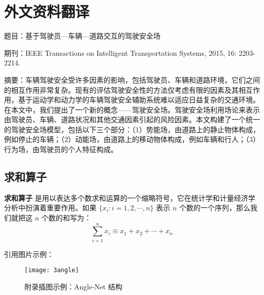 
\chapter{外文资料翻译}

题目：基于驾驶员—车辆—道路交互的驾驶安全场

期刊：IEEE Transactions on Intelligent Transportation Systems, 2015, 16: 2203-2214.

摘要：车辆驾驶安全受许多因素的影响，包括驾驶员、车辆和道路环境，它们之间的相互作用非常复杂。现有的评估驾驶安全性的方法仅考虑有限的因素及其相互作用，基于运动学和动力学的车辆驾驶安全辅助系统难以适应日益复杂的交通环境。在本文中，我们提出了一个新的概念——驾驶安全场。驾驶安全场利用场论来表示由驾驶员、车辆、道路状况和其他交通因素引起的风险因素。本文构建了一个统一的驾驶安全场模型，包括以下三个部分：（1）势能场，由道路上的静止物体构成，例如停止的车辆；（2）动能场，由道路上的移动物体构成，例如车辆和行人；（3）行为场，由驾驶员的个人特征构成。

\section{求和算子}

\textbf{求和算子} 是用以表达多个数求和运算的一个缩略符号，它在统计学和计量经济学分析中扮演着重要作用。如果 $\{x_i: i=1, 2, \cdots, n\}$ 表示 $n$ 个数的一个序列，那么我们就把这 $n$ 个数的和写为：
\begin{equation}
\label{eq:1}
\sum_{i=1}^n x_i \equiv x_1 + x_2 +\cdots + x_n
\end{equation}

引用图片示例：

\begin{figure}[!htbp]
	\centering
	\texttt{[image: 3angle]}
	\caption{附录插图示例：Angle-Net 结构}
     \label{appen:angle}
\end{figure}
